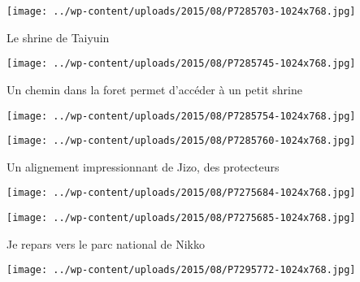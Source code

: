  

\begin{center} \texttt{[image: ../wp-content/uploads/2015/08/P7285703-1024x768.jpg]} \end{center}

 

 Le shrine de Taiyuin 

 

\begin{center} \texttt{[image: ../wp-content/uploads/2015/08/P7285745-1024x768.jpg]} \end{center}

 

 Un chemin dans la foret permet d'accéder à un petit shrine 

 

\begin{center} \texttt{[image: ../wp-content/uploads/2015/08/P7285754-1024x768.jpg]} \end{center}

 

 

\begin{center} \texttt{[image: ../wp-content/uploads/2015/08/P7285760-1024x768.jpg]} \end{center}

 

 Un alignement impressionnant de Jizo, des protecteurs 

 

\begin{center} \texttt{[image: ../wp-content/uploads/2015/08/P7275684-1024x768.jpg]} \end{center}

 

 

\begin{center} \texttt{[image: ../wp-content/uploads/2015/08/P7275685-1024x768.jpg]} \end{center}

 

 Je repars vers le parc national de Nikko 

 

\begin{center} \texttt{[image: ../wp-content/uploads/2015/08/P7295772-1024x768.jpg]} \end{center}

 

 


